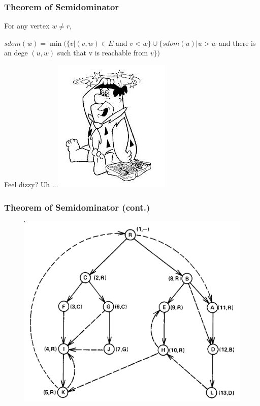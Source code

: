 \documentclass[]{beamer}
\begin{document}
\begin{frame}
  \frametitle{Theorem of Semidominator}
  \begin{theorem}
    For any vertex $w \neq r$,

    $sdom(w) = \min ( \{ v | (v,w) \in E$ and $v<w \} \cup \{ sdom(u) | u>w$ and
    there is an dege $(u,w)$ such that v is reachable from $v\})$
  \end{theorem}

  \vspace{1em}\pause
  Feel dizzy? Uh ...\hfill\includegraphics[height=.3\textheight]{figures/dizzy.jpeg}
\end{frame}

\begin{frame}
  \frametitle{Theorem of Semidominator (cont.)}
  \begin{figure}
    \includegraphics[height=.55\textheight]{figures/dfst}
  \end{figure}
\end{frame}
\end{document}
